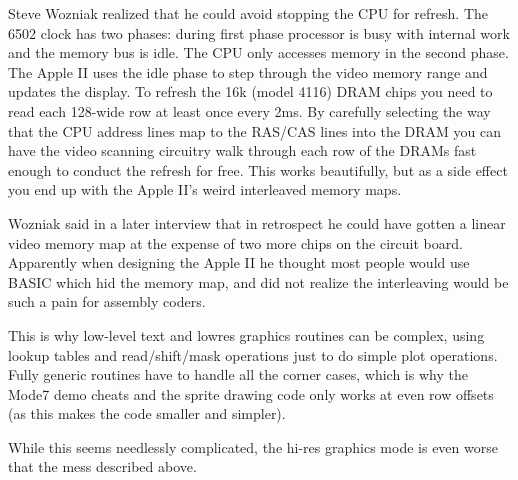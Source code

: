 \documentclass{article}
\begin{document}
Steve Wozniak realized that he could avoid stopping the CPU for refresh.
The 6502 clock has two phases:
during first phase processor is busy
with internal work and the memory bus is idle.
The CPU only accesses memory in the second phase.
The Apple II uses the idle phase to step through the video memory
range and updates the display.
To refresh the 16k (model 4116) DRAM chips you need to read each 128-wide
row at least once every 2ms.
By carefully selecting the way that the CPU address lines map to
the RAS/CAS lines into the DRAM you can have the video scanning
circuitry walk through each row of the DRAMs fast enough to
conduct the refresh for free. 
This works beautifully, but as a side effect you end up with the Apple II's
weird interleaved memory maps.

%
%
%

Wozniak said in a later interview that in retrospect he could have
gotten a linear video memory map at the expense of two more chips
on the circuit board.
Apparently when designing the Apple II he thought most people would use BASIC
which hid the memory map, and did not realize the interleaving would
be such a pain for assembly coders.

This is why low-level text and lowres graphics routines
can be complex, using lookup tables and
read/shift/mask operations just to do simple plot operations.
Fully generic routines have to handle all the corner cases, which is why
the Mode7 demo cheats and the sprite drawing code only works
at even row offsets (as this makes the code smaller and simpler).

While this seems needlessly complicated, the hi-res graphics mode
is even worse that the mess described above.


\end{document}
